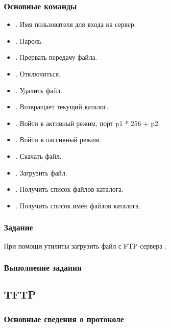 \subsubsection{Основные команды}
\begin{itemize}
	\item {}. Имя пользователя для входа на сервер.
	\item {}. Пароль.
	\item {}. Прервать передачу файла.
	\item {}. Отключиться.
	\item {}. Удалить файл.
	\item {}. Возвращает текущий каталог.
	\item {}. Войти в активный режим, порт p1 * 256 + p2.
	\item {}. Войти в пассивный режим.
	\item {}. Скачать файл.
	\item {}. Загрузить файл.
	\item {}. Получить список файлов каталога.
	\item {}. Получить список имён файлов каталога.
\end{itemize}

\subsubsection{Задание} 

\noindent При помощи утилиты  загрузить файл с FTP-сервера .

\subsubsection{Выполнение задания}



\subsection{TFTP}

\subsubsection{Основные сведения о протоколе}


